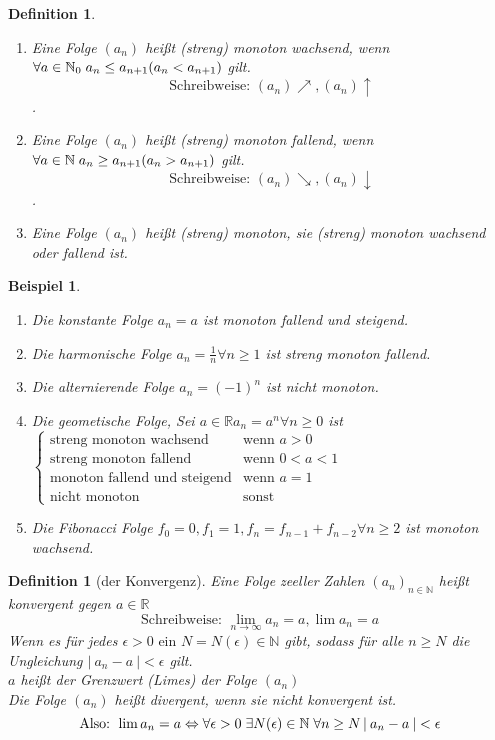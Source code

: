 \documentclass[a4paper,titlepage,oneside]{article}
\def\N{\ensuremath{\mathbb{N}} }
\def\R{\ensuremath{\mathbb{R}} }
\def\fa{\ensuremath{\forall}}
\def\ex{\ensuremath{\exists}}
\def\sp{\hspace{0,1cm}}
\renewcommand{\liminf}[2][n]{\ensuremath{\lim\limits_{#1 \rightarrow \infty}{#2}}}
\newcommand{\abs}[1]{\ensuremath{\left|\:#1\:\right|}}
\theoremstyle{thmstyle}
\newtheorem{defi}[satz]{Definition}
\newtheorem{bsp}[satz]{Beispiel}
\begin{document}
\begin{defi}
\begin{enumerate}
\item Eine Folge \((a_n)\) heißt (streng) monoton wachsend, wenn \( \fa a \in \N_0 \sp a_n \le a_{n+1} (a_n < a_{n+1})\) gilt.
\[\text{Schreibweise: }(a_n)\nearrow, (a_n)\uparrow\].
\item Eine Folge \((a_n)\) heißt (streng) monoton fallend, wenn \( \fa a \in \N \sp a_n \ge a_{n+1} (a_n > a_{n+1})\) gilt.
\[\text{Schreibweise: } (a_n)\searrow, (a_n)\downarrow\].
\item Eine Folge \((a_n)\) heißt (streng) monoton, sie (streng) monoton wachsend oder fallend ist.
\end{enumerate}
\end{defi}

\begin{bsp}
\begin{enumerate}
\item Die konstante Folge \(a_n = a\) ist monoton fallend und steigend.
\item Die harmonische Folge \(a_n = \frac{1}{n} \fa n \ge 1\) ist streng monoton fallend.
\item Die alternierende Folge \(a_n = (-1)^n\) ist nicht monoton.
\item Die geometische Folge, Sei \(a \in \R a_n = a^n \fa n \ge 0 \) ist \(\begin{cases}
\text{streng monoton wachsend} & \text{wenn } a > 0\\
\text{streng monoton fallend} & \text{wenn } 0 < a < 1\\
\text{monoton fallend und steigend} & \text{wenn } a = 1\\
\text{nicht monoton} & \text{sonst}
\end{cases} \)
\item Die Fibonacci Folge \(f_0 = 0, f_1 = 1, f_n = f_{n-1} + f_{n-2} \fa{n \ge 2}\) ist monoton wachsend.
\end{enumerate}
\end{bsp}

\begin{defi}[der Konvergenz]
Eine Folge zeeller Zahlen \((a_n)_{n\in\N}\) heißt konvergent gegen \( a\in\R\)
\[\text{Schreibweise: } \liminf{a_n} = a, \lim{a_n} = a\]
Wenn es für jedes \(\epsilon > 0 \text{ ein } N = N(\epsilon) \in \N\) gibt, sodass für alle \(n \ge N\) die Ungleichung \(\abs{a_n - a} < \epsilon\) gilt.\\
\(a\) heißt der Grenzwert (Limes) der Folge \((a_n)\)\\
Die Folge \((a_n)\) heißt divergent, wenn sie nicht konvergent ist.
\[\text{Also: } \lim{a_n} = a \Leftrightarrow \fa \epsilon > 0 \sp \ex N(\epsilon) \in \N \sp \fa n\ge N \abs{a_n - a} < \epsilon\]
\end{defi}
\end{document}
